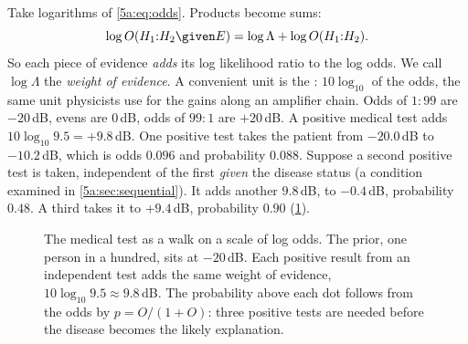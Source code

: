 Take logarithms of \eqref{5a:eq:odds}. Products become sums:
\begin{equation}
  \log O(H_1{:}H_2\given E)=\log\Lambda+\log O(H_1{:}H_2) .
  \label{5a:eq:logodds}
\end{equation}
So each piece of evidence \emph{adds} its log likelihood ratio to the log odds. We
call $\log\Lambda$ the \emph{weight of evidence}. A convenient unit is the
: $10\log_{10}$ of the odds, the same unit physicists use for the
gains along an amplifier chain. Odds of $1:99$ are $-20\,$dB, evens are $0\,$dB,
odds of $99:1$ are $+20\,$dB. A positive medical test adds
$10\log_{10}9.5=+9.8\,$dB. One positive test takes the patient from $-20.0\,$dB to
$-10.2\,$dB, which is odds $0.096$ and probability $0.088$. Suppose a second
positive test is taken, independent of the first \emph{given} the disease status
(a condition examined in \cref{5a:sec:sequential}). It adds another $9.8\,$dB, to
$-0.4\,$dB, probability $0.48$. A third takes it to $+9.4\,$dB, probability $0.90$
(\cref{5a:fig:decibels}).

\begin{figure}[htbp]
\centering
{}
\caption{The medical test as a walk on a scale of log odds. The prior, one person in a
hundred, sits at $-20\,$dB. Each positive result from an independent test adds the
same weight of evidence, $10\log_{10}9.5\approx9.8\,$dB. The probability above each
dot follows from the odds by $p=O/(1+O)$: three positive tests are needed before the
disease becomes the likely explanation.}
\label{5a:fig:decibels}
\end{figure}

